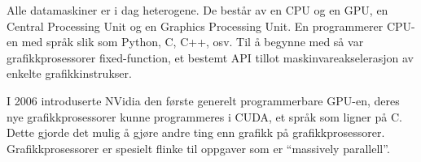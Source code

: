 
Alle datamaskiner er i dag heterogene. De består av en CPU og en GPU, en Central Processing Unit og en Graphics Processing Unit. En programmerer CPU-en med språk slik som Python, C, C++, osv. Til å begynne med så var grafikkprosessorer fixed-function, et bestemt API tillot maskinvareakselerasjon av enkelte grafikkinstrukser. \cite{Buck 2006 s. 5}

I 2006 introduserte NVidia den første generelt programmerbare GPU-en, deres nye grafikkprosessorer kunne programmeres i CUDA, et språk som ligner på C. Dette gjorde det mulig å gjøre andre ting enn grafikk på grafikkprosessorer. Grafikkprosessorer er spesielt flinke til oppgaver som er ``massively parallell''. \cite{Buck 2006 s. 1} %

